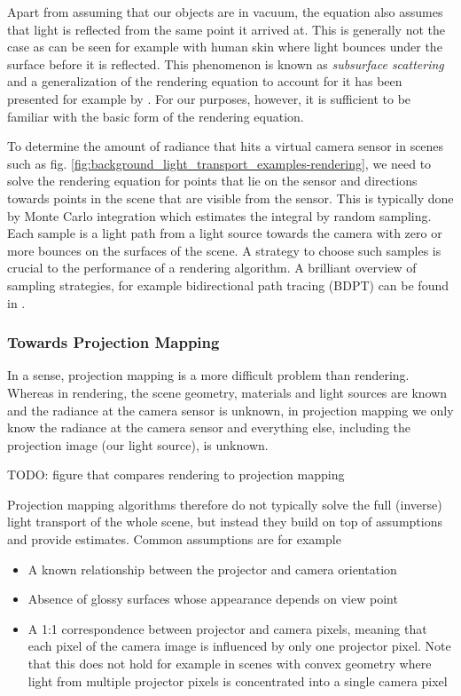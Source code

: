 Apart from assuming that our objects are in vacuum, the equation also assumes that light is reflected from the same point it arrived at. This is generally not the case as can be seen for example with human skin where light bounces under the surface before it is reflected. This phenomenon is known as \textit{subsurface scattering} and a generalization of the rendering equation to account for it has been presented for example by \citet{Jensen2001}. For our purposes, however, it is sufficient to be familiar with the basic form of the rendering equation.

To determine the amount of radiance that hits a virtual camera sensor in scenes such as fig. \ref{fig:background_light_transport_examples-rendering}, we need to solve the rendering equation for points that lie on the sensor and directions towards points in the scene that are visible from the sensor. This is typically done by Monte Carlo integration which estimates the integral by random sampling. Each sample is a light path from a light source towards the camera with zero or more bounces on the surfaces of the scene. A strategy to choose such samples is crucial to the performance of a rendering algorithm. A brilliant overview of sampling strategies, for example bidirectional path tracing (BDPT) can be found in \citet{Veach1997}.

\subsubsection{Towards Projection Mapping}
\label{section:background-projection_mapping-light_transport-towards_projection_mapping}

In a sense, projection mapping is a more difficult problem than rendering. Whereas in rendering, the scene geometry, materials and light sources are known and the radiance at the camera sensor is unknown, in projection mapping we only know the radiance at the camera sensor and everything else, including the projection image (our light source), is unknown.

{\color{red} TODO: figure that compares rendering to projection mapping}

Projection mapping algorithms therefore do not typically solve the full (inverse) light transport of the whole scene, but instead they build on top of assumptions and provide estimates. Common assumptions are for example

\begin{itemize}
    \item A known relationship between the projector and camera orientation
    \item Absence of glossy surfaces whose appearance depends on view point
    \item A 1:1 correspondence between projector and camera pixels, meaning that each pixel of the camera image is influenced by only one projector pixel. Note that this does not hold for example in scenes with convex geometry where light from multiple projector pixels is concentrated into a single camera pixel
\end{itemize}

